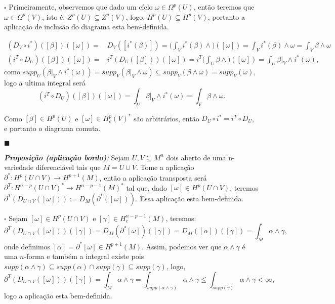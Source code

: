 \documentclass{article}
\begin{document}
	$\square$ Primeiramente, observemos que dado um cíclo $\omega \in \Omega^{p}(U)$, então teremos que $\omega \in \Omega^{p}(V)$, isto é, $Z^{p}(U) \subseteq Z^{p}(V)$, logo, $H^{p}(U) \subseteq H^{p}(V)$, portanto a aplicação de inclusão do diagrama esta bem-definida.
		
	$$
	\begin{aligned}
	(D_{V}\circ i^{*} )([\beta])([\omega])
	=& D_{V} ([i^{*}(\beta)]) = \Big( \int_{V} i^{*}(\beta) \wedge \Big)([\omega]) = \int_{V} i^{*}(\beta) \wedge \omega = \int_{V} \beta \wedge \omega 
	\\
	(i^{T} \circ D_{U})([\beta])([\omega]) =& i^{T}(D_{U}([\beta]))([\omega]) = i^{T}\Big( \int_{U} \beta \wedge \Big)([\omega]) = \int_{U} \beta|_{V} \wedge i^{*}(\omega),
	\end{aligned}
	$$	
	como $supp_{U}(\beta|_{V} \wedge i^{*}(\omega)) = supp_{V}(\beta|_{V} \wedge \omega) \subseteq  supp_{V}(\beta \wedge \omega) = supp_{V}(\omega)$, logo a ultima integral será
	$$
	(i^{T} \circ D_{U})([\beta])([\omega]) =\int_{U} \beta|_{V} \wedge i^{*}(\omega) = \int_{V} \beta \wedge \omega.
	$$
	
	Como $[\beta] \in H^{p}(U)$ e $[\omega] \in H^{p}_{c}(V)^{*}$ são arbitrários, então $D_{U}\circ i^{*}  = i^{T} \circ D_{U}$, e portanto o diagrama comuta.
	
	$\blacksquare$
	
	\vspace{2mm}
	\textit{\textbf{Proposição (aplicação bordo)}:} Sejam $U, V \subseteq M^{n}$ dois aberto de uma n-variedade diferenciável tais que $M = U \cup V$. Tome a aplicação $\partial^{*}: H^{p}(U\cap V) \to H^{p+1}(M)$, então a aplicação transposta será $\partial^{T} : H^{n-p}(U\cap V)^{*} \to H^{n-p-1}(M)^{*}$ tal que, dado $[\omega] \in H^{p}(U \cap V)$, teremos $\partial^{T}(D_{U\cap V}([\omega])) := D_{M}(\partial^{*}([\omega]))$. Essa aplicação esta bem-definida.
	
	$\square$ Sejam $[\omega] \in H^{p}(U \cap V)$ e $[\gamma] \in H^{n-p-1}_{c}(M)$, teremos:
	$$
	\partial^{T}(D_{U\cap V}([\omega]))([\gamma]) = D_{M}(\partial^{*}[\omega])([\gamma]) = D_{M}([\alpha])([\gamma]) = \int_{M} \alpha \wedge \gamma,
	$$
	onde definimos $[\alpha] = \partial^{*}[\omega] \in H^{p+1}(M)$. Assim, podemos ver que $\alpha \wedge \gamma$ é uma $n$-forma e também a integral existe pois $supp(\alpha \wedge \gamma) \subseteq supp(\alpha) \cap supp(\gamma) \subseteq supp(\gamma)$, logo, 
	$$
	\partial^{T}(D_{U\cap V}([\omega]))([\gamma]) = \int_{M} \alpha \wedge \gamma = \int_{supp(\alpha \wedge \gamma)} \alpha \wedge \gamma \leq \int_{supp(\gamma)} \alpha \wedge \gamma < \infty,
	$$
	logo a aplicação esta bem-definida.
	
\end{document}
